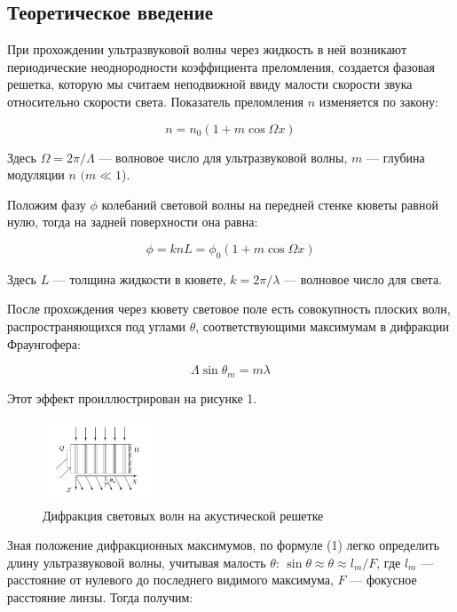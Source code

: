 \documentclass[a4paper, 12pt]{article}%
\begin{document}
	\subsection{Теоретическое введение}	
	При прохождении ультразвуковой волны через жидкость в ней возникают периодические неоднородности коэффициента преломления, создается фазовая решетка, которую мы считаем неподвижной ввиду малости скорости звука относительно скорости света. Показатель
	преломления $n$ изменяется по закону:
	
	\begin{equation}\label{}
	n = n_0 (1 + m \cos \Omega x)
	\end{equation}
	
	Здесь $ \Omega = 2 \pi / \Lambda $ --- волновое число для ультразвуковой волны, $ m $ --- глубина модуляции $ n $ $ (m \ll 1 $).
	
	Положим фазу $ \phi $ колебаний световой волны на передней стенке кюветы равной нулю, тогда на задней поверхности она равна:
	
	\begin{equation}\label{}
	\phi  = k n L = \phi_0 (1 + m \cos \Omega x)
	\end{equation}
	
	Здесь $ L $ --- толщина жидкости в кювете, $ k = 2 \pi / \lambda $ --- волновое число для света.
	
	После прохождения через кювету световое поле есть совокупность плоских волн, распространяющихся под углами $ \theta $, соответствующими максимумам в дифракции Фраунгофера:
	
\begin{equation}\label{}	
	\Lambda \sin \theta_m = m \lambda
\end{equation}

	Этот эффект проиллюстрирован на рисунке 1.
	\begin{figure}[h!]
		\centering	
		\includegraphics[width=0.3\textwidth]{pic/wave.png}
		\caption{Дифракция световых волн на акустической решетке}
		\label{diff}
	\end{figure}
    Зная положение дифракционных максимумов, по формуле (1) легко определить длину ультразвуковой волны, учитывая малость $ \theta $: $ \sin \theta \approx \theta \approx l_m /F  $, где $ l_m $ --- расстояние от нулевого до последнего видимого максимума, $ F $ --- фокусное расстояние линзы. Тогда получим:
    	
\end{document}
